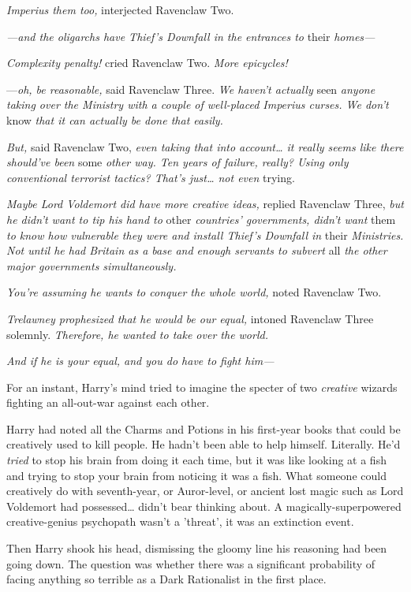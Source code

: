 \emph{Imperius them too,} interjected Ravenclaw Two.

\emph{---and the oligarchs have Thief's Downfall in the entrances to} their\emph{ homes---}

\emph{Complexity penalty!} cried Ravenclaw Two. \emph{More epicycles!}

---\emph{oh, be reasonable,} said Ravenclaw Three. \emph{We haven't actually} seen\emph{ anyone taking over the Ministry with a couple of well-placed Imperius curses. We don't} know\emph{ that it can actually be done that easily.}

\emph{But,} said Ravenclaw Two, \emph{even taking that into account{\ldots} it really seems like there should've been} some\emph{ other way. Ten years of failure, really? Using only conventional terrorist tactics? That's just{\ldots} not even} trying.

\emph{Maybe Lord Voldemort did have more creative ideas,} replied Ravenclaw Three, \emph{but he didn't want to tip his hand to} other\emph{ countries' governments, didn't want} them\emph{ to know how vulnerable they were and install Thief's Downfall in} their\emph{ Ministries. Not until he had Britain as a base and enough servants to subvert} all\emph{ the other major governments simultaneously.}

\emph{You're assuming he wants to conquer the whole world,} noted Ravenclaw Two.

\emph{Trelawney prophesized that he would be our equal,} intoned Ravenclaw Three solemnly. \emph{Therefore, he wanted to take over the world.}

\emph{And if he is your equal, and you do have to fight him---}

For an instant, Harry's mind tried to imagine the specter of two \emph{creative} wizards fighting an all-out-war against each other.

Harry had noted all the Charms and Potions in his first-year books that could be creatively used to kill people. He hadn't been able to help himself. Literally. He'd \emph{tried} to stop his brain from doing it each time, but it was like looking at a fish and trying to stop your brain from noticing it was a fish. What someone could creatively do with seventh-year, or Auror-level, or ancient lost magic such as Lord Voldemort had possessed{\ldots} didn't bear thinking about. A magically-superpowered creative-genius psychopath wasn't a 'threat', it was an extinction event.

Then Harry shook his head, dismissing the gloomy line his reasoning had been going down. The question was whether there was a significant probability of facing anything so terrible as a Dark Rationalist in the first place.

